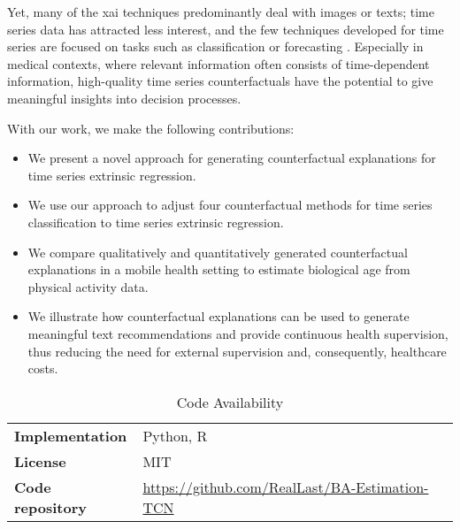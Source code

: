 Yet, many of the \gls{xai} techniques predominantly deal with images or texts; time series data has attracted less interest, and the few techniques developed for time series are focused on tasks such as classification or forecasting \cite{theissler_explainable_2022}.     Especially in medical contexts, where relevant information often consists of time-dependent information, high-quality time series counterfactuals have the potential to give meaningful insights into decision processes.

With our work, we make the following contributions:
\begin{itemize}
    \item We present a novel approach for generating counterfactual explanations for time series extrinsic regression.
    \item We use our approach to adjust four counterfactual methods for time series classification to time series extrinsic regression.
    \item We compare qualitatively and quantitatively generated counterfactual explanations in a mobile health setting to estimate biological age from physical activity data.
    \item We illustrate how counterfactual explanations can be used to generate meaningful text recommendations and provide continuous health supervision, thus reducing the need for external supervision and, consequently, healthcare costs.
\end{itemize}

\begin{table}[h!t]
\caption{Code Availability}
\label{tab:introduction:code_and_website}
\centering
\renewcommand*{\arraystretch}{1.4}
\begin{tabularx}{\columnwidth}{l|X}
\hline
\textbf{Implementation} & Python, R\\
\textbf{License} & MIT \\
\textbf{Code repository} & \url{https://github.com/RealLast/BA-Estimation-TCN}\\
\hline
\end{tabularx}
\end{table}

